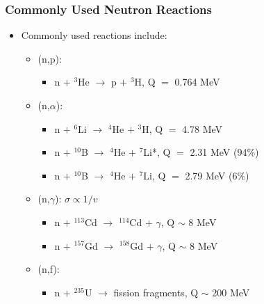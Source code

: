\subsubsection{Commonly Used Neutron Reactions}
\begin{itemize}
    \item Commonly used reactions include:
    \begin{itemize}
        \item (n,p):
        \begin{itemize}
            \item[] n $+$ $^3$He $\rightarrow$ p $+$ $^3$H, Q $=$ 0.764 MeV
        \end{itemize}
        \item (n,$\alpha$):
        \begin{itemize}
            \item[] n $+$ $^6$Li $\rightarrow$ $^4$He $+$ $^3$H, Q $=$ 4.78 MeV
            \item[] n $+$ $^{10}$B $\rightarrow$ $^{4}$He $+$ $^7$Li*, Q $=$ 2.31 MeV (94\%)
            \item[] n $+$ $^{10}$B $\rightarrow$ $^{4}$He $+$ $^7$Li, Q $=$ 2.79 MeV (6\%)
        \end{itemize}
        \item (n,$\gamma$): $\sigma\propto1/v$
        \begin{itemize}
            \item[] n $+$ $^{113}$Cd $\rightarrow$ $^{114}$Cd $+$ $\gamma$, Q $\sim$ 8 MeV
            \item[] n $+$ $^{157}$Gd $\rightarrow$ $^{158}$Gd $+$ $\gamma$, Q $\sim$ 8 MeV
        \end{itemize}
        \item (n,f):
        \begin{itemize}
            \item[] n $+$ $^{235}$U $\rightarrow$ fission fragments, Q $\sim$ 200 MeV
        \end{itemize}
    \end{itemize}
\end{itemize}

